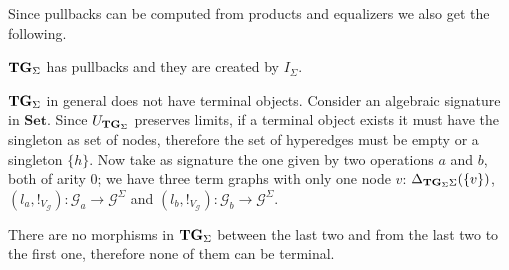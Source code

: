 \documentclass[runningheads,envcountsect]{lipics-v2021}
\newcommand{\Set}{\mathbf{Set}}
\newcommand{\catname}[1]{\textbf{\textup{#1}}}
\newcommand{\tg}[0]{\catname{TG}_{\Sigma}}
\begin{document}
Since pullbacks can be computed from products and equalizers we also get the following.

\begin{corollary}\label{cor:pb}$\tg$ has pullbacks and they are created by $I_\Sigma$.
\end{corollary}
\begin{remark}
	$\tg$ in general does not have terminal objects. Consider an algebraic signature in $\Set$. Since $U_{\tg}$ preserves limits, if a terminal object exists it must have the singleton as set of nodes, therefore the set of hyperedges must be empty or a singleton $\{h\}$. Now take as signature the one given by two operations $a$ and $b$, both of arity $0$; we have three term graphs with only one node $v$: $\Delta_{\tg{\Sigma}}(\{v\})$, $(l_a, !_{V_{\mathcal{G}}})\colon \mathcal{G}_a\to \mathcal{G}^{\Sigma}$ and $(l_b, !_{V_{\mathcal{G}}})\colon \mathcal{G}_b\to \mathcal{G}^{\Sigma}$.
	\begin{center}
	\end{center}
	There are no morphisms in $\tg$ between the last two and from the last two to the first one, therefore none of them can be terminal.
\end{remark}
\end{document}
